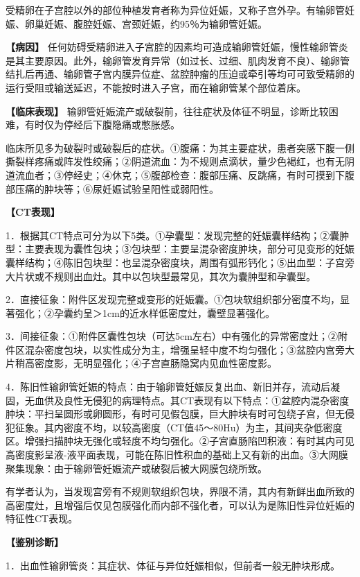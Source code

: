 受精卵在子宫腔以外的部位种植发育者称为异位妊娠，又称子宫外孕。有输卵管妊娠、卵巢妊娠、腹腔妊娠、宫颈妊娠，约95％为输卵管妊娠。

\textbf{【病因】}
任何妨碍受精卵进入子宫腔的因素均可造成输卵管妊娠，慢性输卵管炎是其主要原因。此外，输卵管发育异常（如过长、过细、肌肉发育不良）、输卵管结扎后再通、输卵管子宫内膜异位症、盆腔肿瘤的压迫或牵引等均可可致受精卵的运行受阻或输送延迟，不能按时进入子宫，而在输卵管某个部位着床。

\textbf{【临床表现】}
输卵管妊娠流产或破裂前，往往症状及体征不明显，诊断比较困难，有时仅为停经后下腹隐痛或憋胀感。

临床所见多为破裂时或破裂后的症状。①腹痛：为其主要症状，患者突感下腹一侧撕裂样疼痛或阵发性绞痛；②阴道流血：为不规则点滴状，量少色褐红，也有无阴道流血者；③停经史；④休克；⑤腹部检查：腹部压痛、反跳痛，有时可摸到下腹部压痛的肿块等；⑥尿妊娠试验呈阳性或弱阳性。

\textbf{【CT表现】}

1．根据其CT特点可分为以下5类。①孕囊型：发现完整的妊娠囊样结构；②囊肿型：主要表现为囊性包块；③包块型：主要呈混杂密度肿块，部分可见变形的妊娠囊样结构；④陈旧包块型：也呈混杂密度块，周围有弧形钙化；⑤出血型：子宫旁大片状或不规则出血灶。其中以包块型最常见，其次为囊肿型和孕囊型。

2．直接征象：附件区发现完整或变形的妊娠囊。①包块软组织部分密度不均，显著强化；②孕囊约呈＞1cm的近水样低密度灶，囊壁显著强化。

3．间接征象：①附件区囊性包块（可达5cm左右）中有强化的异常密度灶；②附件区混杂密度包块，以实性成分为主，增强呈轻中度不均匀强化；③盆腔内宫旁大片稍高密度影，无明显强化；④子宫直肠隐窝内见血性密度影。

4．陈旧性输卵管妊娠的特点：由于输卵管妊娠反复出血、新旧并存，流动后凝固，无血供及良性无侵犯的病理特点。其CT表现有以下特点：①盆腔内混杂密度肿块：平扫呈圆形或卵圆形，有时可见假包膜，巨大肿块有时可包绕子宫，但无侵犯征象。其内密度不均，以较高密度（CT值45～80Hu）为主，其间夹杂低密度区。增强扫描肿块无强化或轻度不均匀强化。②子宫直肠陷凹积液：有时其内可见高密度影呈液-液平面表现，可能在陈旧性积血的基础上又有新的出血。③大网膜聚集现象：由于输卵管妊娠流产或破裂后被大网膜包绕所致。

有学者认为，当发现宫旁有不规则软组织包块，界限不清，其内有新鲜出血所致的高密度灶，且增强后仅见包膜强化而内部不强化者，可以认为是陈旧性异位妊娠的特征性CT表现。

\textbf{【鉴别诊断】}

1．出血性输卵管炎：其症状、体征与异位妊娠相似，但前者一般无肿块形成。

